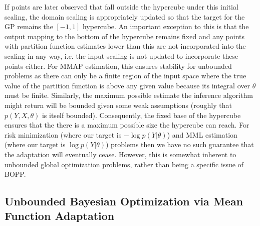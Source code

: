 If points are later observed that fall outside the hypercube under this initial scaling, the domain scaling 
is appropriately updated so that the target for the GP remains the $[-1,1]$ hypercube.  
An important exception to this is that the output mapping to the bottom of the hypercube remains 
fixed and any points with partition function estimates lower than this are not incorporated into the scaling in any way,
i.e. the input scaling is not updated to incorporate these points either.
For MMAP estimation, this ensures stability for unbounded problems as there can only be a finite region
of the input space where the true value of the partition function is above any given value because its integral
over $\theta$ must be finite.  Similarly, the
maximum possible estimate the inference algorithm might return will be bounded
given some weak assumptions (roughly that $p(Y,X,\theta)$ is itself bounded).
Consequently, the fixed base of the hypercube ensures that the 
there is a maximum possible size the hypercube can reach.
For risk minimization (where our target is $-\log p(Y|\theta)$) and  MML estimation
(where our target is $\log p(Y|\theta)$) problems then we have no such guarantee that the adaptation will 
eventually cease.  However, this is somewhat inherent to unbounded global optimization problems,
rather than being a specific issue of BOPP.

\subsection{Unbounded Bayesian Optimization via Mean Function Adaptation}
\label{sec:bopp:unbounded}

